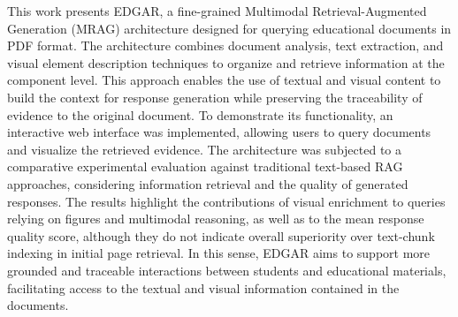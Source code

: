
This work presents EDGAR, a fine-grained Multimodal Retrieval-Augmented Generation (MRAG) architecture designed for querying educational documents in PDF format. The architecture combines document analysis, text extraction, and visual element description techniques to organize and retrieve information at the component level. This approach enables the use of textual and visual content to build the context for response generation while preserving the traceability of evidence to the original document. To demonstrate its functionality, an interactive web interface was implemented, allowing users to query documents and visualize the retrieved evidence. The architecture was subjected to a comparative experimental evaluation against traditional text-based RAG approaches, considering information retrieval and the quality of generated responses. The results highlight the contributions of visual enrichment to queries relying on figures and multimodal reasoning, as well as to the mean response quality score, although they do not indicate overall superiority over text-chunk indexing in initial page retrieval. In this sense, EDGAR aims to support more grounded and traceable interactions between students and educational materials, facilitating access to the textual and visual information contained in the documents.


